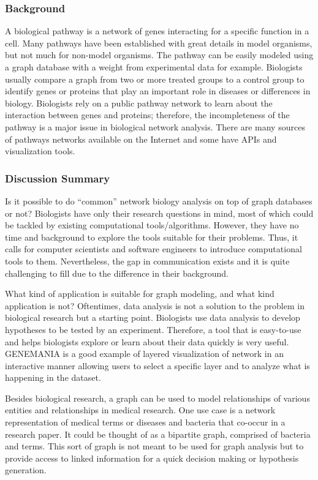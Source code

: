 \documentclass[runningheads]{llncs}
\begin{document}
\subsubsection{Background}
A biological pathway is a network of genes interacting for a specific function in a cell. Many pathways have been established with great details in model organisms, but not much for non-model organisms. The pathway can be easily modeled using a graph database with a weight from experimental data for example. Biologists usually compare a graph from two or more treated groups to a control group to identify genes or proteins that play an important role in diseases or differences in biology. Biologists rely on a public pathway network to learn about the interaction between genes and proteins; therefore, the incompleteness of the pathway is a major issue in biological network analysis. There are many sources of pathways networks available on the Internet and some have APIs and visualization tools.

\subsubsection{Discussion Summary}
Is it possible to do “common” network biology analysis on top of graph databases or not?
Biologists have only their research questions in mind, most of which could be tackled by existing computational tools/algorithms. However, they have no time and background to explore the tools suitable for their problems. Thus, it calls for computer scientists and software engineers to introduce computational tools to them. Nevertheless, the gap in communication exists and it is quite challenging to fill due to the difference in their background.

What kind of application is suitable for graph modeling, and what kind application is not? Oftentimes, data analysis is not a solution to the problem in biological research but a starting point. Biologists use data analysis to develop hypotheses to be tested by an experiment. Therefore, a tool that is easy-to-use and helps biologists explore or learn about their data quickly is very useful. GENEMANIA is a good example of layered visualization of network in an interactive manner allowing users to select a specific layer and to analyze what is happening in the dataset.

Besides biological research, a graph can be used to model relationships of various entities and relationships in medical research. One use case is a network representation of medical terms or diseases and bacteria that co-occur in a research paper. It could be thought of as a bipartite graph, comprised of bacteria and terms. This sort of graph is not meant to be used for graph analysis but to provide access to linked information for a quick decision making or hypothesis generation.
\end{document}
